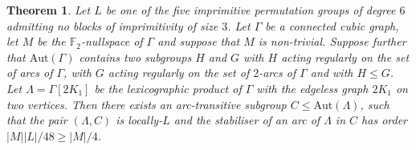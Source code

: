 \documentclass{amsart}
\newtheorem{theorem}{Theorem}
\theoremstyle{definition}
\begin{document}
\begin{theorem}
\label{thm:L}
Let $L$ be one of the five imprimitive permutation groups of degree $6$ admitting no blocks of imprimitivity of size $3$.
Let $\Gamma$ be a connected cubic graph, let $M$ be the  ${{\mathbb F}}_2$-nullspace of $\Gamma$ and suppose that $M$ is non-trivial.
Suppose further that ${\mathrm{Aut}}(\Gamma)$ contains two subgroups $H$ and $G$ with $H$ acting regularly on the set of arcs of $\Gamma$, with $G$ acting regularly on the set of $2$-arcs of $\Gamma$ and with $H\leq G$. Let $\Lambda=\Gamma[2K_1]$ be the lexicographic product of $\Gamma$ with the edgeless graph $2K_1$ on two vertices. Then  there exists an arc-transitive subgroup $C\le {\mathrm{Aut}}(\Lambda)$, such that the pair $(\Lambda,C)$ is locally-$L$ and the stabiliser of an arc of $\Lambda$ in $C$ has order $|M| |L|/48\geq |M|/4$.
\end{theorem}
\end{document}
